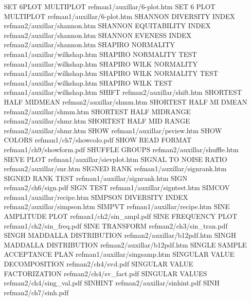 SET 6PLOT MULTIPLOT                     refman1/auxillar/6-plot.htm
SET 6 PLOT MULTIPLOT                    refman1/auxillar/6-plot.htm
SHANNON DIVERSITY INDEX                 refman2/auxillar/shannon.htm
SHANNON EQUITABILITY INDEX              refman2/auxillar/shannon.htm
SHANNON EVENESS INDEX                   refman2/auxillar/shannon.htm
SHAPIRO NORMALITY                       refman1/auxillar/wilkshap.htm
SHAPIRO NORMALITY TEST                  refman1/auxillar/wilkshap.htm
SHAPIRO WILK NORMALITY                  refman1/auxillar/wilkshap.htm
SHAPIRO WILK NORMALITY TEST             refman1/auxillar/wilkshap.htm
SHAPIRO WILK TEST                       refman1/auxillar/wilkshap.htm
SHIFT                                   refman2/auxillar/shift.htm
SHORTEST HALF MIDMEAN                   refman2/auxillar/shmm.htm
SHORTEST HALF MI DMEAN                  refman2/auxillar/shmm.htm
SHORTEST HALF MIDRANGE                  refman2/auxillar/shmr.htm
SHORTEST HALF MID RANGE                 refman2/auxillar/shmr.htm
SHOW                                    refman1/auxillar/psview.htm
SHOW COLORS                             refman1/ch7/showcolo.pdf
SHOW READ FORMAT                        refman1/ch9/showform.pdf
SHUFFLE GROUPS                          refman2/auxillar/shuffle.htm
SIEVE PLOT                              refman1/auxillar/sievplot.htm
SIGNAL TO NOISE RATIO                   refman2/auxillar/snr.htm
SIGNED RANK                             refman1/auxillar/signrank.htm
SIGNED RANK TEST                        refman1/auxillar/signrank.htm
SIGN                                    refman2/ch6/sign.pdf
SIGN TEST                               refman1/auxillar/signtest.htm
SIMCOV                                  refman1/auxillar/recipe.htm
SIMPSON DIVERSITY INDEX                 refman2/auxillar/simpson.htm
SIMPVT                                  refman1/auxillar/recipe.htm
SINE AMPLITUDE PLOT                     refman1/ch2/sin_ampl.pdf
SINE FREQUENCY PLOT                     refman1/ch2/sin_freq.pdf
SINE TRANSFORM                          refman2/ch3/sin_tran.pdf
SINGH MADDALLA DISTRIBUTION             refman2/auxillar/b12pdf.htm
SINGH MADDALLA DISTRIBUTION             refman2/auxillar/b12pdf.htm
SINGLE SAMPLE ACCEPTANCE PLAN           refman1/auxillar/singsamp.htm
SINGULAR VALUE DECOMPOSITION            refman2/ch4/svd.pdf
SINGULAR VALUE FACTORIZATION            refman2/ch4/sv_fact.pdf
SINGULAR VALUES                         refman2/ch4/sing_val.pdf
SINHINT                                 refman2/auxillar/sinhint.pdf
SINH                                    refman2/ch7/sinh.pdf
